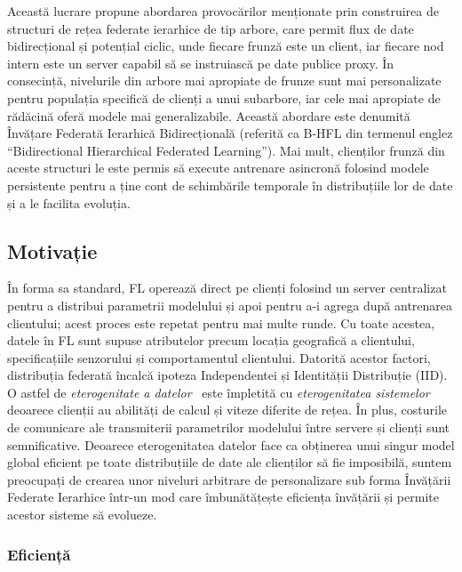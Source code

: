 Această lucrare propune abordarea provocărilor menționate prin construirea de structuri de rețea federate ierarhice de tip arbore, care permit flux de date bidirecțional și potențial ciclic, unde fiecare frunză este un client, iar fiecare nod intern este un server capabil să se instruiască pe date publice proxy. În consecință, nivelurile din arbore mai apropiate de frunze sunt mai personalizate pentru populația specifică de clienți a unui subarbore, iar cele mai apropiate de rădăcină oferă modele mai generalizabile. Această abordare este denumită Învățare Federată Ierarhică Bidirecțională (referită ca B-HFL din termenul englez ``Bidirectional Hierarchical Federated Learning''). Mai mult, clienților frunză din aceste structuri le este permis să execute antrenare asincronă folosind modele persistente pentru a ține cont de schimbările temporale în distribuțiile lor de date și a le facilita evoluția.
\subsection{Motivație}

În forma sa standard, FL operează direct pe clienți folosind un server centralizat pentru a distribui parametrii modelului și apoi pentru a-i agrega după antrenarea clientului; acest proces este repetat pentru mai multe runde. Cu toate acestea, datele în FL sunt supuse atributelor precum locația geografică a clientului, specificațiile senzorului și comportamentul clientului. Datorită acestor factori, distribuția federată încalcă ipoteza Independentei și Identității Distribuție (IID). O astfel de \emph{eterogenitate a datelor}~\citep[sec. 3.1]{AdvancedAndOpenProblems} este împletită cu \emph{eterogenitatea sistemelor}~\citep[sec. 7.2]{AdvancedAndOpenProblems} deoarece clienții au abilități de calcul și viteze diferite de rețea. În plus, costurile de comunicare ale transmiterii parametrilor modelului între servere și clienți sunt semnificative. Deoarece eterogenitatea datelor face ca obținerea unui singur model global eficient pe toate distribuțiile de date ale clienților să fie imposibilă, suntem preocupați de crearea unor niveluri arbitrare de personalizare sub forma Învățării Federate Ierarhice într-un mod care îmbunătățește eficiența învățării și permite acestor sisteme să evolueze.
\subsubsection{Eficiență}

